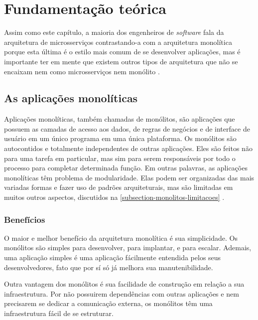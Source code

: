 \chapter{Fundamentação teórica}\label{chapter-fundamentacao}


Assim como este capítulo, a maioria dos engenheiros de \emph{software} fala da arquitetura de microsserviços contrastando-a com a arquitetura monolítica porque esta última é o estilo mais comum de se desenvolver aplicações, mas é importante ter em mente que existem outros tipos de arquitetura que não se encaixam nem como microsserviços nem monólito \cite{martin-fowler-microservice-tradeoffs}.

\section{As aplicações monolíticas}\label{sessao-monolitos}

Aplicações monolíticas, também chamadas de monólitos, são aplicações que possuem as camadas de acesso aos dados, de regras de negócios e de interface de usuário em um único programa em uma única plataforma. Os monólitos são autocontidos e totalmente independentes de outras aplicações. Eles são feitos não para uma tarefa em particular, mas sim para serem responsáveis por todo o processo para completar determinada função. Em outras palavras, as aplicações monolíticas têm problema de modularidade. Elas podem ser organizadas das mais variadas formas e fazer uso de padrões arquiteturais, mas são limitadas em muitos outros aspectos, discutidos na \autoref{subsection-monolitos-limitacoes} \cite{wiki_monolithic_2022}.

\subsection{Benefícios}

O maior e melhor benefício da arquitetura monolítica é sua simplicidade. Os monólitos são simples para desenvolver, para implantar, e para escalar. Ademais, uma aplicação simples é uma aplicação fácilmente entendida pelos seus desenvolvedores, fato que por sí só já melhora sua manutenibilidade.

Outra vantagem dos monólitos é sua facilidade de construção em relação a sua infraestrutura. Por não possuirem dependências com outras aplicações e nem precisarem se dedicar a comunicação externa, os monólitos têm uma infraestrutura fácil de se estruturar.

